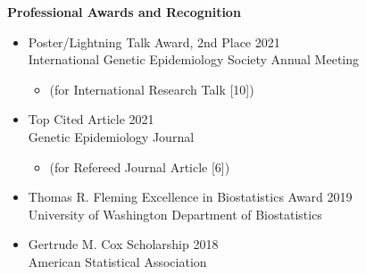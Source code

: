 \documentclass[margin]{res}
\begin{document}
\begin{resume}
\textbf{Professional Awards and Recognition}
\begin{itemize}
\item Poster/Lightning Talk Award, 2nd Place   \hfill 2021 \\
International Genetic Epidemiology Society Annual Meeting
	\begin{itemize}[leftmargin=-0in] \vspace{-0.2cm}
	\item[] 
	\begin{footnotesize}(for International Research Talk [10])\end{footnotesize}
	\end{itemize} \vspace{-0.1cm}
\item Top Cited Article  \hfill 2021 \\
Genetic Epidemiology Journal
	\begin{itemize}[leftmargin=-0in] \vspace{-0.2cm}
	\item[] 
	\begin{footnotesize}(for Refereed Journal Article [6])\end{footnotesize}
	\end{itemize} \vspace{-0.1cm}
\item Thomas R. Fleming Excellence in Biostatistics Award \hfill 2019 \\   
University of Washington Department of Biostatistics
\item Gertrude M. Cox Scholarship \hfill 2018 \\ American Statistical Association

\end{itemize}
\end{resume}
\end{document}
